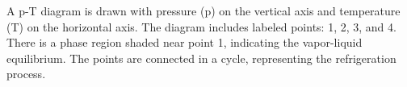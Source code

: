 A p-T diagram is drawn with pressure (p) on the vertical axis and temperature (T) on the horizontal axis. The diagram includes labeled points: 1, 2, 3, and 4. There is a phase region shaded near point 1, indicating the vapor-liquid equilibrium. The points are connected in a cycle, representing the refrigeration process.